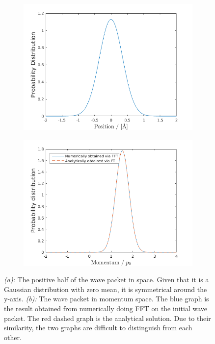\begin{figure}[H]
    \centering
    \captionsetup[subfigure]{justification=centering}
    \begin{subfigure}[b]{0.8\textwidth}
        \centering
        \includegraphics[width=\textwidth]{graphics/task1/position_prob.png}
		\caption{}
		\label{fig:1_a}
    \end{subfigure}
    \begin{subfigure}[b]{0.8\textwidth}
        \centering
        \includegraphics[width=\textwidth]{graphics/task1/momentum_prob.png}
        \caption{}
		\label{fig:1_b}
    \end{subfigure}
    \caption{\textit{(a):} The positive half of the wave packet in space. Given that it is a Gaussian distribution with zero mean, it is symmetrical around the y-axis. \textit{(b):} The wave packet in momentum space. The blue graph is the result obtained from numerically doing FFT on the initial wave packet. The red dashed graph is the analytical solution. Due to their similarity, the two graphs are difficult to distinguish from each other.}
    \label{fig:1}
\end{figure}

